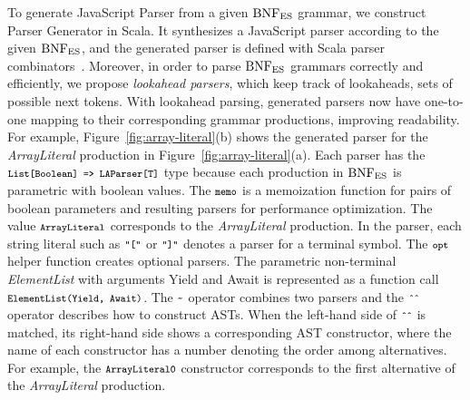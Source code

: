 To generate {\sf JavaScript Parser} from a given \( \text{BNF}_{\text{ES}} \) grammar, we
construct \textsf{Parser Generator} in Scala.  It synthesizes a
JavaScript parser according to the given \( \text{BNF}_{\text{ES}} \), and the
generated parser is defined with Scala parser combinators~\cite{scala-parser-combinators}.
Moreover, in order to parse \( \text{BNF}_{\text{ES}} \) grammars correctly and
efficiently, we propose \textit{lookahead parsers}, which keep track
of lookaheads, sets of possible next tokens.  With lookahead parsing,
generated parsers now have one-to-one mapping to their corresponding
grammar productions, improving readability.
For example, Figure~\ref{fig:array-literal}(b) shows the generated
parser for the \textit{ArrayLiteral} production in Figure~\ref{fig:array-literal}(a).
Each parser has the \( \texttt{\footnotesize List[Boolean] => LAParser[T]} \) type
because each production in \( \text{BNF}_{\text{ES}} \) is parametric with boolean values.
The \( \texttt{\footnotesize memo} \) is a memoization function for pairs of boolean
parameters and resulting parsers for performance optimization.
The value \( \texttt{\footnotesize ArrayLiteral} \) corresponds to the
\textit{ArrayLiteral} production.  In the parser, each string literal
such as \( \texttt{\footnotesize"["} \) or \( \texttt{\footnotesize"]"} \) denotes a parser for a
terminal symbol.  The \( \texttt{\footnotesize opt} \) helper function creates
optional parsers.  The parametric non-terminal \textit{ElementList}
with arguments \textsf{Yield} and \textsf{Await} is represented as a
function call \( \texttt{\footnotesize ElementList(Yield, Await)} \).
The \( \texttt{\footnotesize\textasciitilde} \) operator combines two parsers
and the \( \texttt{\footnotesize\^{}\^{}} \) operator describes how to construct ASTs.
When the left-hand side of \( \texttt{\footnotesize\^{}\^{}} \) is matched, its
right-hand side shows a corresponding AST constructor, where the name
of each constructor has a number denoting the order among alternatives.
For example, the \( \texttt{\footnotesize ArrayLiteral0} \) constructor corresponds to
the first alternative of the \textit{ArrayLiteral} production.

